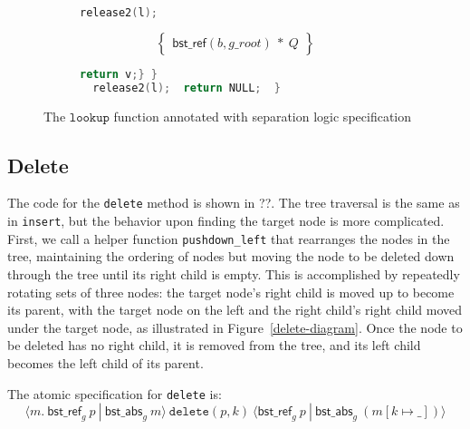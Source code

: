 \documentclass[runningheads]{llncs}
\newcommand{\treerep}{\ensuremath{\mathsf{bst\_abs}}}
\newcommand{\nodeboxrep}{\ensuremath{\mathsf{bst\_ref}}}
\begin{document}
{\begin{figure}[htp]
\begin{subfigure}[t]{1\textwidth}
        \begin{lstlisting}[language = C,  numbers = none]
      release2(l);
         \end{lstlisting}
       $$\left\{\begin{array}{l} \nodeboxrep(b,g\_root)\ *\ Q\end{array}\right\}$$
         \begin{lstlisting}[language = C, numbers = none]
       return v;} }
  release2(l);  return NULL;  }
 \end{lstlisting} 
\end{subfigure}
\caption{The $\texttt{lookup}$ function annotated with separation logic specification}
\label{lookupproof}
\end{figure} }

\subsection{Delete}

The code for the \lstinline{delete} method is shown in ??. %
The tree traversal is the same as in \lstinline{insert}, but the behavior upon finding the target node is more complicated. First, we call a helper function \lstinline{pushdown_left} that rearranges the nodes in the tree, maintaining the ordering of nodes but moving the node to be deleted down through the tree until its right child is empty. This is accomplished by repeatedly rotating sets of three nodes: the target node's right child is moved up to become its parent, with the target node on the left and the right child's right child moved under the target node, as illustrated in Figure~\ref{delete-diagram}.
Once the node to be deleted has no right child, it is removed from the tree, and its left child becomes the left child of its parent.

The atomic specification for \lstinline{delete} is:
$$\langle m.\ \nodeboxrep_g\ p\ |\ \treerep_g\ m\rangle\ \texttt{delete}(p, k)\ \langle \nodeboxrep_g\ p\ |\ \treerep_g\ (m[k \mapsto \_])\rangle$$
\end{document}
